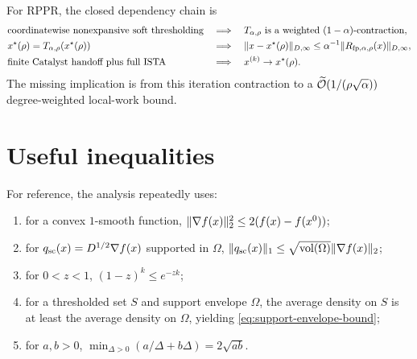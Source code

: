 For RPPR, the closed dependency chain is
\begin{align*}
  &\text{coordinatewise nonexpansive soft thresholding}
    &&\Longrightarrow\quad
      T_{\alpha,\rho}\text{ is a weighted }(1-\alpha)\text{-contraction},\\
  &x^\star(\rho)=T_{\alpha,\rho}(x^\star(\rho))
    &&\Longrightarrow\quad
      \lVert x-x^\star(\rho)\rVert_{D,\infty}
      \leq\alpha^{-1}\lVert R_{\mathrm{fp},\alpha,\rho}(x)\rVert_{D,\infty},\\
  &\text{finite Catalyst handoff plus full ISTA}
    &&\Longrightarrow\quad
      x^{(k)}\to x^\star(\rho).
\end{align*}
The missing implication is from this iteration contraction to a
$\widetilde{\mathcal{O}}(1/(\rho\sqrt\alpha))$ degree-weighted local-work bound.

\section{Useful inequalities}
\label{app:inequalities}

For reference, the analysis repeatedly uses:
\begin{enumerate}[leftmargin=2em]
  \item for a convex $1$-smooth function,
        $\lVert\nabla f(x)\rVert_2^2\leq2(f(x)-f(x^0))$;
  \item for $q_{\rm sc}(x)=D^{1/2}\nabla f(x)$ supported in $\Omega$,
        $\lVert q_{\rm sc}(x)\rVert_1
        \leq\sqrt{\operatorname{vol}(\Omega)}\lVert\nabla f(x)\rVert_2$;
  \item for $0<z<1$, $(1-z)^k\leq e^{-zk}$;
  \item for a thresholded set $S$ and support envelope $\Omega$,
        the average density on $S$ is at least the average density on
        $\Omega$, yielding \cref{eq:support-envelope-bound};
  \item for $a,b>0$,
        $\min_{\Delta>0}(a/\Delta+b\Delta)=2\sqrt{ab}$.
\end{enumerate}

